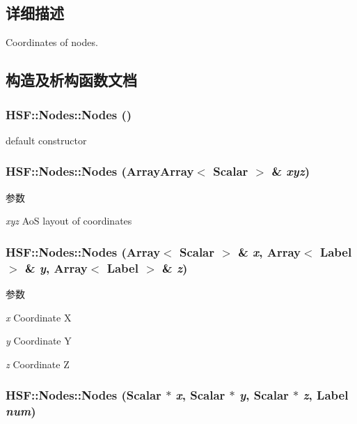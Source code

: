 \subsection{详细描述}
Coordinates of nodes. 

\subsection{构造及析构函数文档}
\hypertarget{classHSF_1_1Nodes_a4cf0a36ef0cbd1d2183e6f426289b3ef}{
\subsubsection[{Nodes}]{\setlength{\rightskip}{0pt plus 5cm}HSF::Nodes::Nodes ()}}
\label{classHSF_1_1Nodes_a4cf0a36ef0cbd1d2183e6f426289b3ef}


default constructor \hypertarget{classHSF_1_1Nodes_a6c4e1453888f5fa3008d992d1f19c1b4}{
\subsubsection[{Nodes}]{\setlength{\rightskip}{0pt plus 5cm}HSF::Nodes::Nodes ({\bf ArrayArray}$<$ {\bf Scalar} $>$ \& {\em xyz})}}
\label{classHSF_1_1Nodes_a6c4e1453888f5fa3008d992d1f19c1b4}

\begin{DoxyParams}{参数}
\item[{\em xyz}]AoS layout of coordinates \end{DoxyParams}
\hypertarget{classHSF_1_1Nodes_aa08a28dcddd6fdbc64fef3d3c7bfba82}{
\subsubsection[{Nodes}]{\setlength{\rightskip}{0pt plus 5cm}HSF::Nodes::Nodes (Array$<$ {\bf Scalar} $>$ \& {\em x}, \/  Array$<$ {\bf Label} $>$ \& {\em y}, \/  Array$<$ {\bf Label} $>$ \& {\em z})}}
\label{classHSF_1_1Nodes_aa08a28dcddd6fdbc64fef3d3c7bfba82}

\begin{DoxyParams}{参数}
\item[{\em x}]Coordinate X \item[{\em y}]Coordinate Y \item[{\em z}]Coordinate Z \end{DoxyParams}
\hypertarget{classHSF_1_1Nodes_a545e2813acfe02611c3ef8d659c8ce2f}{
\subsubsection[{Nodes}]{\setlength{\rightskip}{0pt plus 5cm}HSF::Nodes::Nodes ({\bf Scalar} $\ast$ {\em x}, \/  {\bf Scalar} $\ast$ {\em y}, \/  {\bf Scalar} $\ast$ {\em z}, \/  {\bf Label} {\em num})}}
\label{classHSF_1_1Nodes_a545e2813acfe02611c3ef8d659c8ce2f}

